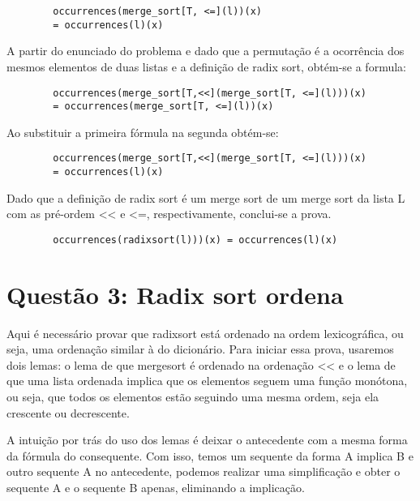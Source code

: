 \documentclass[12pt]{article}
\begin{document}
        \begin{verbatim}
        occurrences(merge_sort[T, <=](l))(x) 
        = occurrences(l)(x)
        \end{verbatim}
        
        A partir do enunciado do problema e dado que a permutação é a ocorrência dos mesmos elementos de duas listas e a definição de radix sort, obtém-se a formula:
        
        \begin{verbatim}
        occurrences(merge_sort[T,<<](merge_sort[T, <=](l)))(x) 
        = occurrences(merge_sort[T, <=](l))(x)
        \end{verbatim}
        
        Ao substituir a primeira fórmula na segunda obtém-se:
        
        \begin{verbatim}
        occurrences(merge_sort[T,<<](merge_sort[T, <=](l)))(x) 
        = occurrences(l)(x)
        \end{verbatim}
        
        Dado que a definição de radix sort é um merge sort de um merge sort da lista L com as pré-ordem << e <=, respectivamente, conclui-se a prova.
        
        \begin{verbatim}
        occurrences(radixsort(l)))(x) = occurrences(l)(x)
        \end{verbatim}
        
    \section{Questão 3: Radix sort ordena}
    
        Aqui é necessário provar que radixsort está ordenado na ordem lexicográfica, ou seja, uma ordenação similar à do dicionário. Para iniciar essa prova, usaremos dois lemas: o lema de que mergesort é ordenado na ordenação << e o lema de que uma lista ordenada implica que os elementos seguem uma função monótona, ou seja, que todos os elementos estão seguindo uma mesma ordem, seja ela crescente ou decrescente.
        
        A intuição por trás do uso dos lemas é deixar o antecedente com a mesma forma da fórmula do consequente. Com isso, temos um sequente da forma A implica B e outro sequente A no antecedente, podemos realizar uma simplificação e obter o sequente A e o sequente B apenas, eliminando a implicação.
        
\end{document}
